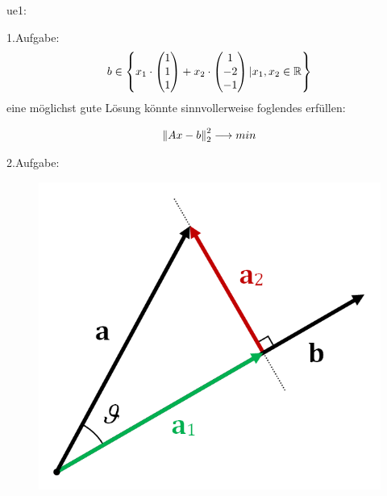 ue1:

1.Aufgabe:
\begin{equation}
\begin{split}
b \in \left\{ x_1 \cdot \begin{pmatrix*} 1\\ 1\\ 1 \end{pmatrix*} + x_2 \cdot \begin{pmatrix*} 1\\ -2\\ -1 \end{pmatrix*} | x_1, x_2 \in \R \right\}
\end{split}
\end{equation}
eine möglichst \glqq gute\grqq{} Lösung könnte sinnvollerweise foglendes erfüllen:

\[
\left\lVert Ax-b\right\rVert^2_2 \longrightarrow min
\]

2.Aufgabe:
\begin{figure}[ht]
	\centering
	\includegraphics[scale=.3]{Projection_and_rejection.png}
\end{figure}

